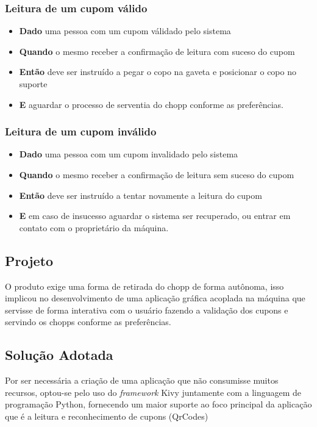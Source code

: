         \subsubsection[Leitura de um cupom válido]{Leitura de um cupom válido}
            \begin{itemize}
                    \item \textbf{Dado} uma pessoa com um cupom válidado pelo sistema
                    \item \textbf{Quando} o mesmo receber a confirmação de leitura com suceso do cupom
                    \item \textbf{Então} deve ser instruído a pegar o copo na gaveta e posicionar o copo
                            no suporte
                    \item \textbf{E} aguardar o processo de serventia do chopp conforme as preferências.
            \end{itemize}

         \subsubsection[Leitura de um cupom inválido]{Leitura de um cupom inválido}
            \begin{itemize}
                    \item \textbf{Dado} uma pessoa com um cupom invalidado pelo sistema
                    \item \textbf{Quando} o mesmo receber a confirmação de leitura sem suceso do cupom
                    \item \textbf{Então} deve ser instruído a tentar novamente a leitura do cupom
                    \item \textbf{E} em caso de insucesso aguardar o sistema ser recuperado, ou entrar
                            em contato com o proprietário da máquina.
            \end{itemize}

     \subsection[Projeto]{Projeto}
        O produto exige uma forma de retirada do chopp de forma autônoma, isso implicou no desenvolvimento
        de uma aplicação gráfica acoplada na máquina que servisse de forma interativa com o usuário fazendo
        a validação dos cupons e servindo os chopps conforme as preferências.

     \subsection[Solução Adotada]{Solução Adotada}
        Por ser necessária a criação de uma aplicação que não consumisse muitos recursos, optou-se pelo
        uso do \textit{framework} Kivy juntamente com a linguagem de programação Python, fornecendo
        um maior suporte ao foco principal da aplicação que é a leitura e reconhecimento de cupons (QrCodes)

